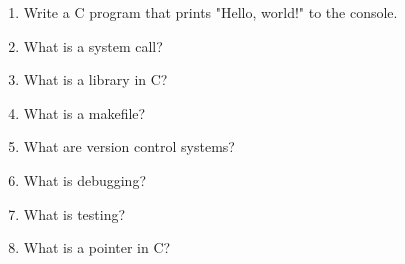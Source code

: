\documentclass{article}
\begin{document}
\begin{enumerate}
\item Write a C program that prints "Hello, world!" to the console.
\item What is a system call?
\item What is a library in C?
\item What is a makefile?
\item What are version control systems?
\item What is debugging?
\item What is testing?
\item What is a pointer in C?
\end{enumerate}
\end{document}
